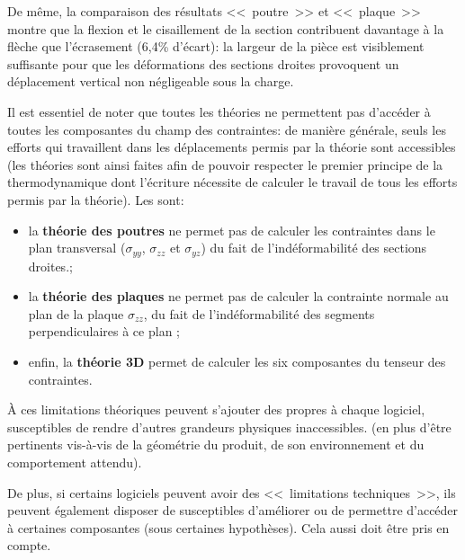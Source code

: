 De même, la comparaison des résultats <<~poutre~>> et <<~plaque~>> montre que la flexion et le
cisaillement de la section contribuent davantage à la flèche que l'écrasement (6,4\% d'écart):
la largeur de la pièce est visiblement suffisante pour que les déformations des sections droites
provoquent un déplacement vertical non négligeable sous la charge.

\medskip
Il est essentiel de noter que toutes les théories ne permettent pas d'accéder à toutes les
composantes du champ des contraintes: de manière générale, seuls les efforts qui travaillent
dans les déplacements permis par la théorie sont accessibles (les théories sont ainsi faites
afin de pouvoir respecter le premier principe de la thermodynamique dont l'écriture nécessite
de calculer le travail de tous les efforts permis par la théorie).
Les  sont:
\begin{itemize}
   \item la \textbf{théorie des poutres} ne permet pas de calculer les contraintes dans le plan
	transversal ($\sigma_{yy}$, $\sigma_{zz}$ et $\sigma_{yz}$) du fait de l'indéformabilité
	des sections droites.;
   \item la \textbf{théorie des plaques} ne permet pas de calculer la contrainte normale au plan de la plaque
	$\sigma_{zz}$, du fait de l'indéformabilité des segments perpendiculaires à ce plan ;
   \item enfin, la \textbf{théorie 3D} permet de calculer les six composantes du tenseur des contraintes.
\end{itemize}

\medskip
À ces limitations théoriques peuvent s'ajouter des 
propres à chaque logiciel, susceptibles de rendre d'autres grandeurs physiques inaccessibles.
 (en plus d'être pertinents vis-à-vis de la géométrie du produit, de son environnement
et du comportement attendu).

De plus, si certains logiciels peuvent avoir des <<~limitations techniques~>>, ils peuvent
également disposer de  susceptibles d'améliorer
ou de permettre d'accéder à certaines composantes (sous certaines hypothèses). Cela aussi
doit être pris en compte.

\ifVersionAvecExemplesSepares\else
\fi

